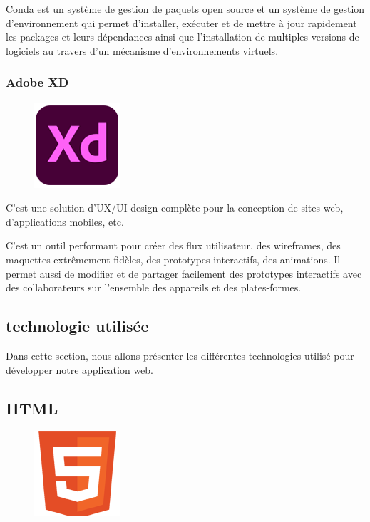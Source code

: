 Conda est un système de gestion de paquets open source et un système de gestion
d’environnement qui permet d’installer, exécuter et de mettre à jour rapidement
les packages et leurs dépendances ainsi que l’installation de multiples versions
de logiciels au travers d’un mécanisme d’environnements virtuels\cite{44}.

\subsubsection*{Adobe XD}
\begin{figure}
    \vspace{-22pt}
    \begin{center}
        \includegraphics[scale=0.36]{images/logo/adobexd.png}
        \label{fig69}
    \end{center}
    \vspace{-20pt}
    \vspace{-10pt}
\end{figure}

C’est une solution d’UX/UI design complète pour la conception de sites web, 
d’applications mobiles, etc.

C’est un outil performant pour créer des flux utilisateur, des wireframes, des
maquettes extrêmement fidèles, des prototypes interactifs, des animations. Il
permet aussi de modifier et de partager facilement des prototypes interactifs
avec des collaborateurs sur l’ensemble des appareils et des
plates-formes\cite{45}.

\subsection{technologie utilisée}
Dans cette section, nous allons présenter les différentes technologies utilisé
pour développer notre application web.

\subsection{HTML}
\begin{figure}
    \vspace{-22pt}
    \begin{center}
        \includegraphics[scale=0.36]{images/logo/html.png}
        \label{fig70}
    \end{center}
    \vspace{-20pt}
    \vspace{-10pt}
\end{figure}

